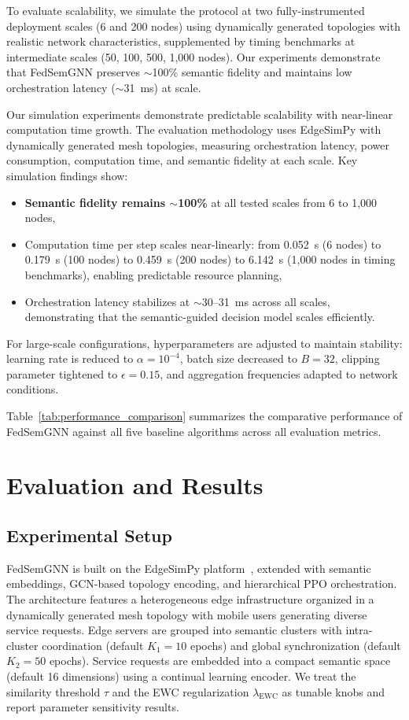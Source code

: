 \documentclass[conference]{IEEEtran}
\begin{document}
	To evaluate scalability, we simulate the protocol at two fully-instrumented deployment scales (6 and 200 nodes) using dynamically generated topologies with realistic network characteristics, supplemented by timing benchmarks at intermediate scales (50, 100, 500, 1{,}000 nodes). Our experiments demonstrate that FedSemGNN preserves $\sim$100\% semantic fidelity and maintains low orchestration latency ($\sim$31~ms) at scale.
	
	Our simulation experiments demonstrate predictable scalability with near-linear computation time growth. The evaluation methodology uses EdgeSimPy with dynamically generated mesh topologies, measuring orchestration latency, power consumption, computation time, and semantic fidelity at each scale. Key simulation findings show:
	\begin{itemize}
		\item \textbf{Semantic fidelity remains ${\sim}$100\%} at all tested scales from 6 to 1{,}000 nodes,
		\item Computation time per step scales near-linearly: from 0.052~s (6 nodes) to 0.179~s (100 nodes) to 0.459~s (200 nodes) to 6.142~s (1{,}000 nodes in timing benchmarks), enabling predictable resource planning,
		\item Orchestration latency stabilizes at ${\sim}$30--31~ms across all scales, demonstrating that the semantic-guided decision model scales efficiently.
	\end{itemize}
	
	For large-scale configurations, hyperparameters are adjusted to maintain stability: learning rate is reduced to $\alpha = 10^{-4}$, batch size decreased to $B = 32$, clipping parameter tightened to $\epsilon = 0.15$, and aggregation frequencies adapted to network conditions.
	
	Table~\ref{tab:performance_comparison} summarizes the comparative performance of FedSemGNN against all five baseline algorithms across all evaluation metrics.
	
	
	\section{Evaluation and Results}
	\label{sec:evaluation}
	
	\subsection{Experimental Setup}
	FedSemGNN is built on the EdgeSimPy platform~\cite{souza2023edgesimpy}, extended with semantic embeddings, GCN-based topology encoding, and hierarchical PPO orchestration. The architecture features a heterogeneous edge infrastructure organized in a dynamically generated mesh topology with mobile users generating diverse service requests. Edge servers are grouped into semantic clusters with intra-cluster coordination (default $K_1=10$ epochs) and global synchronization (default $K_2=50$ epochs). Service requests are embedded into a compact semantic space (default 16 dimensions) using a continual learning encoder. We treat the similarity threshold $\tau$ and the EWC regularization $\lambda_{\mathrm{EWC}}$ as tunable knobs and report parameter sensitivity results.
	
\end{document}
